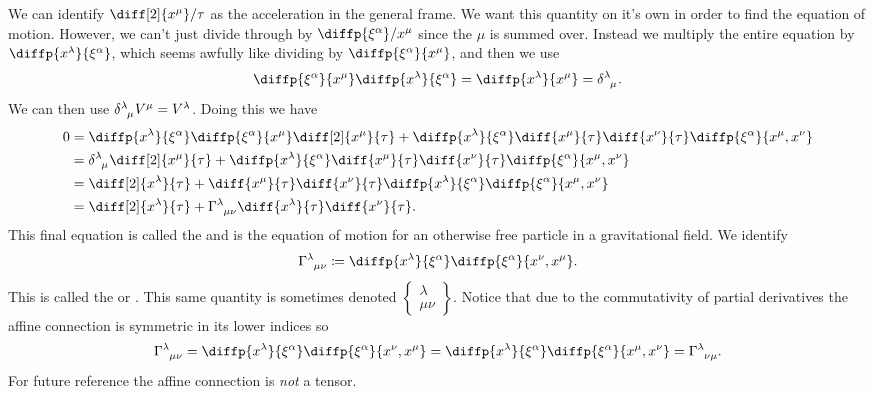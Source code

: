 \documentclass[fleqn]{NotesClass}
\newcommand*{\christoffel}[3]{\tensor{\Gamma}{^{#1}_{{#2}{#3}}}}
\begin{document}
    We can identify \(\diff[2]{x^\mu}/{\tau}\) as the acceleration in the general frame.
    We want this quantity on it's own in order to find the equation of motion.
    However, we can't just divide through by \(\diffp{\xi^\alpha}/{x^\mu}\) since the \(\mu\) is summed over.
    Instead we multiply the entire equation by \(\diffp{x^\lambda}{\xi^\alpha}\), which seems awfully like dividing by \(\diffp{\xi^\alpha}{x^\mu}\), and then we use
    \begin{equation}
        \diffp{\xi^\alpha}{x^\mu}\diffp{x^\lambda}{\xi^\alpha} = \diffp{x^\lambda}{x^\mu} = \tensor{\delta}{^\lambda_\mu}.
    \end{equation}
    We can then use \(\tensor{\delta}{^\lambda_\mu}V^\mu = V^\lambda\).
    Doing this we have
    \begin{align}
        0 &= \diffp{x^\lambda}{\xi^\alpha} \diffp{\xi^\alpha}{x^\mu}\diff[2]{x^\mu}{\tau} + \diffp{x^\lambda}{\xi^\alpha} \diff{x^\mu}{\tau} \diff{x^\nu}{\tau} \diffp{\xi^\alpha}{x^\mu, x^\nu} \\
        &= \tensor{\delta}{^\lambda_\mu} \diff[2]{x^\mu}{\tau} + \diffp{x^\lambda}{\xi^\alpha} \diff{x^\mu}{\tau} \diff{x^\nu}{\tau} \diffp{\xi^\alpha}{x^\mu, x^\nu} \\
        &= \diff[2]{x^\lambda}{\tau} + \diff{x^\mu}{\tau} \diff{x^\nu}{\tau} \diffp{x^\lambda}{\xi^\alpha} \diffp{\xi^\alpha}{x^\mu, x^\nu} \\
        &= \diff[2]{x^\lambda}{\tau} + \christoffel{\lambda}{\mu}{\nu} \diff{x^\lambda}{\tau} \diff{x^\nu}{\tau}.
    \end{align}
    This final equation is called the  and is the equation of motion for an otherwise free particle in a gravitational field.
    We identify
    \begin{equation}
        \christoffel{\lambda}{\mu}{\nu} \coloneqq \diffp{x^\lambda}{\xi^\alpha}\diffp{\xi^\alpha}{x^\nu, x^\mu}.
    \end{equation}
    This is called the \index{\(\christoffel{\lambda}{\mu}{\nu}\), affine connection} or .
    This same quantity is sometimes denoted \(\left\{\begin{smallmatrix} \lambda\\ \mu\nu \end{smallmatrix}\right\}\).
    Notice that due to the commutativity of partial derivatives the affine connection is symmetric in its lower indices so
    \begin{equation}
        \christoffel{\lambda}{\mu}{\nu} = \diffp{x^\lambda}{\xi^\alpha} \diffp{\xi^\alpha}{x^\nu, x^\mu} = \diffp{x^\lambda}{\xi^\alpha} \diffp{\xi^\alpha}{x^\mu, x^\nu} = \christoffel{\lambda}{\nu}{\mu}.
    \end{equation}
    For future reference the affine connection is \emph{not} a tensor.
    
\end{document}
